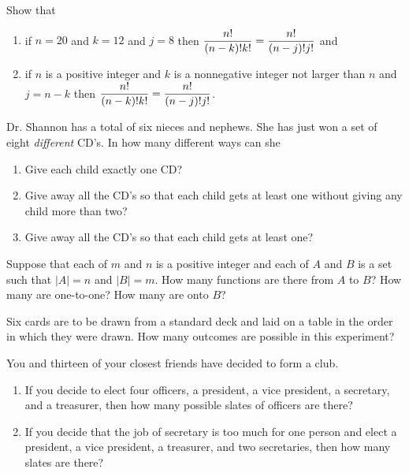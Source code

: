 \begin{prb}
Show that
\begin{enumerate}
\item if $n=20$ and $k=12$ and $j=8$ then $\displaystyle{\frac{n!}{(n-k)!k!} = \frac{n!}{(n-j)!j!}}$ and
\item if $n$ is a positive integer and $k$ is a nonnegative integer not larger than $n$ and $j=n-k$ then $\displaystyle{ \frac{n!}{(n-k)!k!} = \frac{n!}{(n-j)!j!}}$.
\end{enumerate}
\end{prb}

\begin{prb}
Dr. Shannon has a total of six nieces and nephews.  She has just won a set of eight \emph{different} CD's. In how many different ways can she
\begin{enumerate}
\item Give each child exactly one CD?
\item Give away all the CD's so that each child gets at least one without giving any child more than two?
\item Give away all the CD's so that each child gets at least one?
\end{enumerate}
\end{prb}

\begin{prb}
Suppose that each of $m$ and $n$ is a positive integer and each of $A$ and $B$ is a set such that $|A| = n$ and $|B| = m$.  How many functions are there from $A$ to $B$?  How many are one-to-one? How many are onto $B$?
\end{prb}

\begin{prb}
Six cards are to be drawn from a standard deck and laid on a table in the order in which they were drawn. How many outcomes are possible in this experiment?
\end{prb}

\begin{prb}
You and thirteen of your closest friends have decided to form a club.
\begin{enumerate}
\item  If you decide to elect four officers, a president, a vice president, a secretary, and a treasurer, then how many possible slates of officers are there?
\item  If you decide that the job of secretary is too much for one person and elect a president, a vice president, a treasurer, and two secretaries, then how many slates are there?
\end{enumerate}
\end{prb}

